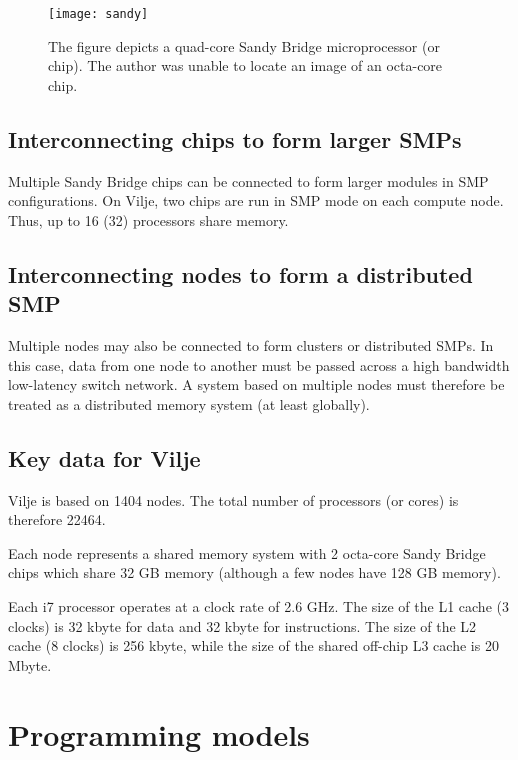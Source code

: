 \begin{figure}
  \begin{center}
    \texttt{[image: sandy]}
  \end{center}
  \caption{
    The figure depicts a quad-core Sandy Bridge microprocessor (or chip). The
    author was unable to locate an image of an octa-core chip.
  }
  \label{fig:p5}
\end{figure}

\subsection{Interconnecting chips to form larger SMPs}

Multiple Sandy Bridge chips can be connected to form larger modules in SMP
configurations. On Vilje, two chips are run in SMP mode on each compute node.
Thus, up to 16 (32) processors share memory.

\subsection{Interconnecting nodes to form a distributed SMP}

Multiple nodes may also be connected to form clusters or distributed SMPs. In
this case, data from one node to another must be passed across a high bandwidth
low-latency switch network. A system based on multiple nodes must therefore be
treated as a distributed memory system (at least globally).

\subsection{Key data for Vilje}

Vilje is based on 1404 nodes. The total number of processors (or cores) is
therefore 22464.

Each node represents a shared memory system with 2 octa-core Sandy Bridge chips
which share 32 GB memory (although a few nodes have 128 GB memory).

Each i7 processor operates at a clock rate of 2.6 GHz. The size of the L1 cache
(3 clocks) is 32 kbyte for data and 32 kbyte for instructions. The size of the
L2 cache (8 clocks) is 256 kbyte, while the size of the shared off-chip L3 cache
is 20 Mbyte.

\section{Programming models}

